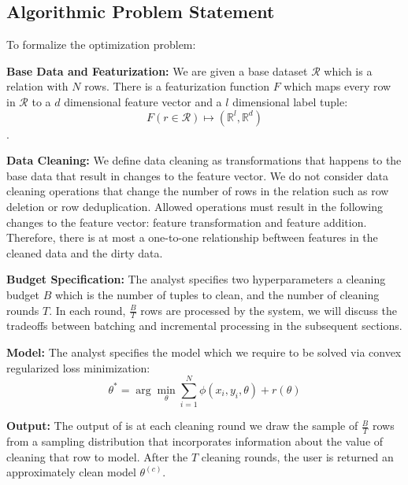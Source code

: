 \fi

\subsection{Algorithmic Problem Statement}
To formalize the optimization problem:

\noindent\textbf{Base Data and Featurization: } We are given a base dataset $\mathcal{R}$ which is a relation with $N$ rows. There is a featurization function $F$ which maps every row in $\mathcal{R}$ to a $d$ dimensional feature vector and a $l$ dimensional label tuple: \[F(r \in \mathcal{R}) \mapsto (\mathbb{R}^l, \mathbb{R}^d)\]. 

\noindent\textbf{Data Cleaning: } We define data cleaning as transformations that happens to the base data that result in changes to the feature vector. We do not consider data cleaning operations that change the number of rows in the relation such as row deletion or row deduplication. Allowed operations must result in the following changes to the feature vector: feature transformation and feature addition. Therefore, there is at most a one-to-one relationship beftween features in the cleaned data and the dirty data.


\noindent\textbf{Budget Specification: } The analyst specifies two hyperparameters a cleaning budget $B$ which is the number of tuples to clean, and the number of cleaning rounds $T$. In each round, $\frac{B}{T}$ rows are processed by the system, we will discuss the tradeoffs between batching and incremental processing in the subsequent sections.


\noindent\textbf{Model: } The analyst specifies the model which we require to be solved via convex regularized loss minimization:
\[
 \theta^{*}=\arg\min_{\theta}\sum_{i=1}^{N}\phi(x_{i},y_{i},\theta) + r(\theta)
\]

\noindent\textbf{Output: } The output of \sys is at each cleaning round we draw the sample of $\frac{B}{T}$ rows from a sampling distribution that incorporates information about the value of cleaning that row to model. After the $T$ cleaning rounds, the user is returned an approximately clean model $\theta^{(c)}$.
